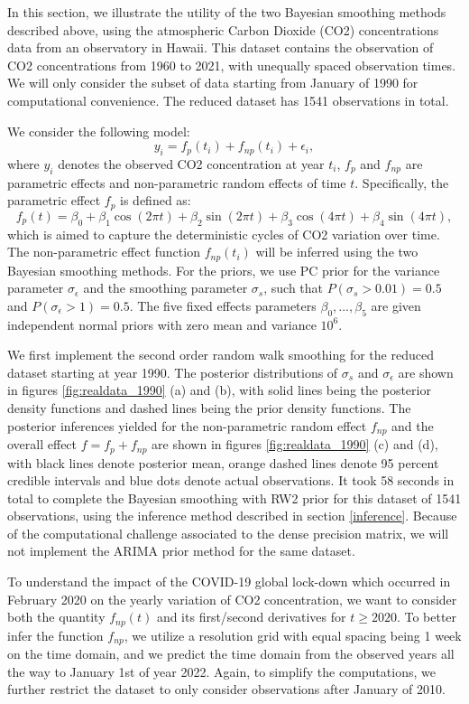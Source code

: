 \documentclass{article}
\begin{document}
In this section, we illustrate the utility of the two Bayesian smoothing methods described above, using the atmospheric Carbon Dioxide (CO2) concentrations data from an observatory in Hawaii. This dataset contains the observation of CO2 concentrations from 1960 to 2021, with unequally spaced observation times. We will only consider the subset of data starting from January of 1990 for computational convenience. The reduced dataset has 1541 observations in total.

We consider the following model: $$y_i = f_{p}(t_i) + f_{np}(t_i) + \epsilon_i,$$ where $y_i$ denotes the observed CO2 concentration at year $t_i$, $f_{p}$ and $f_{np}$ are parametric effects and non-parametric random effects of time $t$. Specifically, the parametric effect $f_{p}$ is defined as: $$f_{p}(t) = \beta_0 + \beta_1 \cos(2\pi t) + \beta_2 \sin(2 \pi t) + \beta_3 \cos(4\pi t) + \beta_4 \sin(4\pi t),$$ which is aimed to capture the deterministic cycles of CO2 variation over time. The non-parametric effect function $f_{np}(t_i)$ will be inferred using the two Bayesian smoothing methods. For the priors, we use PC prior for the variance parameter $\sigma_\epsilon$ and the smoothing parameter $\sigma_s$, such that $P(\sigma_s > 0.01) = 0.5$ and $P(\sigma_\epsilon > 1) = 0.5$. The five fixed effects parameters $\beta_0, ..., \beta_5$ are given independent normal priors with zero mean and variance $10^6$.  


We first implement the second order random walk smoothing for the reduced dataset starting at year 1990. The posterior distributions of $\sigma_s$ and $\sigma_\epsilon$ are shown in figures \ref{fig:realdata_1990} (a) and (b), with solid lines being the posterior density functions and dashed lines being the prior density functions. The posterior inferences yielded for the non-parametric random effect $f_{np}$ and the overall effect $f = f_p + f_{np}$ are shown in figures \ref{fig:realdata_1990} (c) and (d), with black lines denote posterior mean, orange dashed lines denote 95 percent credible intervals and blue dots denote actual observations. It took 58 seconds in total to complete the Bayesian smoothing with RW2 prior for this dataset of 1541 observations, using the inference method described in section \ref{inference}. Because of the computational challenge associated to the dense precision matrix, we will not implement the ARIMA prior method for the same dataset.


To understand the impact of the COVID-19 global lock-down which occurred in February 2020 on the yearly variation of CO2 concentration, we want to consider both the quantity $f_{np}(t)$ and its first/second derivatives for $t \geq 2020$. To better infer the function $f_{np}$, we utilize a resolution grid with equal spacing being 1 week on the time domain, and we predict the time domain from the observed years all the way to January 1st of year 2022. Again, to simplify the computations, we further restrict the dataset to only consider observations after January of 2010.
\end{document}
